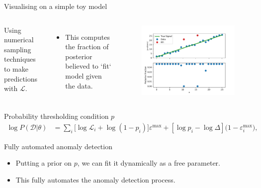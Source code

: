 \documentclass{beamer}
\begin{document}
    \begin{frame}{Visualising on a simple toy model}
        \begin{columns}
        Using numerical sampling techniques to make predictions with $\mathcal{L}$.
        \begin{itemize}
          \item This computes the fraction of posterior believed to `fit` model given the data.
        \end{itemize}
        \begin{figure}
            \includegraphics[width=1.1\textwidth]{test.pdf}
        \end{figure}
        \end{columns}
      \end{frame}

    \begin{frame}{Probability thresholding condition $p$}
        \begin{equation}
        \begin{aligned}
        \log{P(\mathcal{D}|\theta)} &= \sum_{i}[{\log{\mathcal{L}_i}+\log({1-p_i})]\varepsilon^{\mathrm{max}} + [\log{p}_i - \log{\Delta}](1 - \varepsilon^\mathrm{max}_i})\label{eq:loglikelihood},
        \end{aligned}
        \end{equation}
        \centering {}
      \end{frame}

      \begin{frame}{Fully automated anomaly detection}
        \begin{itemize}
        \item Putting a prior on $p$, we can fit it dynamically as a free parameter.
        \item This fully automates the anomaly detection process.
        \end{itemize}
    \end{frame}
\end{document}
